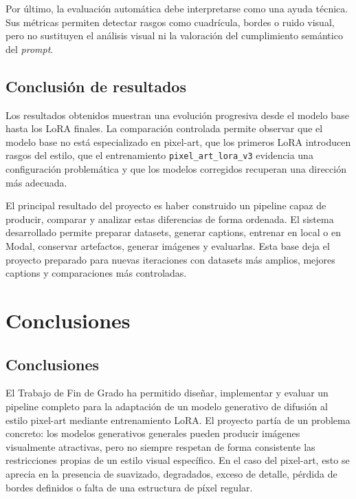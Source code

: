 \documentclass[a4paper,11pt,titlepage]{scrbook}
\begin{document}
\medskip

Por último, la evaluación automática debe interpretarse como una ayuda técnica. Sus métricas permiten detectar rasgos como cuadrícula, bordes o ruido visual, pero no sustituyen el análisis visual ni la valoración del cumplimiento semántico del \textit{prompt}.

\section{Conclusión de resultados}

Los resultados obtenidos muestran una evolución progresiva desde el modelo base hasta los LoRA finales. La comparación controlada permite observar que el modelo base no está especializado en pixel-art, que los primeros LoRA introducen rasgos del estilo, que el entrenamiento \texttt{pixel\_art\_lora\_v3} evidencia una configuración problemática y que los modelos corregidos recuperan una dirección más adecuada.

\medskip

El principal resultado del proyecto es haber construido un pipeline capaz de producir, comparar y analizar estas diferencias de forma ordenada. El sistema desarrollado permite preparar datasets, generar captions, entrenar en local o en Modal, conservar artefactos, generar imágenes y evaluarlas. Esta base deja el proyecto preparado para nuevas iteraciones con datasets más amplios, mejores captions y comparaciones más controladas.


\chapter{Conclusiones}

\section{Conclusiones}
\label{conclusiones}

El Trabajo de Fin de Grado ha permitido diseñar, implementar y evaluar un pipeline completo para la adaptación de un modelo generativo de difusión al estilo pixel-art mediante entrenamiento LoRA. El proyecto partía de un problema concreto: los modelos generativos generales pueden producir imágenes visualmente atractivas, pero no siempre respetan de forma consistente las restricciones propias de un estilo visual específico. En el caso del pixel-art, esto se aprecia en la presencia de suavizado, degradados, exceso de detalle, pérdida de bordes definidos o falta de una estructura de píxel regular.
\end{document}
